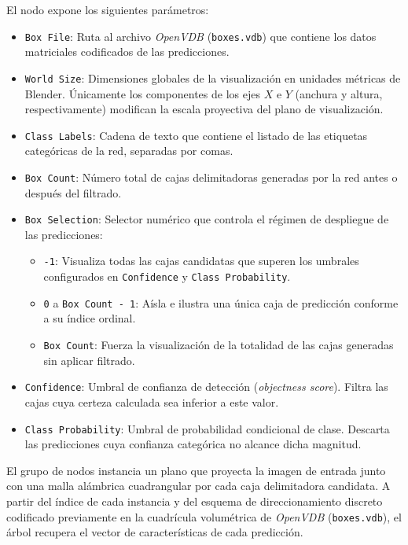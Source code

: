 El nodo expone los siguientes parámetros:
\begin{itemize}
    \item \texttt{Box File}: Ruta al archivo \textit{OpenVDB} (\texttt{boxes.vdb}) que contiene los datos matriciales codificados de las predicciones.
    \item \texttt{World Size}: Dimensiones globales de la visualización en unidades métricas de Blender. Únicamente los componentes de los ejes $X$ e $Y$ 
    (anchura y altura, respectivamente) modifican la escala proyectiva del plano de visualización.
    \item \texttt{Class Labels}: Cadena de texto que contiene el listado de las etiquetas categóricas de la red, separadas por comas.
    \item \texttt{Box Count}: Número total de cajas delimitadoras generadas por la red antes o después del filtrado.
    \item \texttt{Box Selection}: Selector numérico que controla el régimen de despliegue de las predicciones:
    \begin{itemize}
        \item \texttt{-1}: Visualiza todas las cajas candidatas que superen los umbrales configurados en \texttt{Confidence} y \texttt{Class Probability}.
        \item \texttt{0} a \texttt{Box Count - 1}: Aísla e ilustra una única caja de predicción conforme a su índice ordinal.
        \item \texttt{Box Count}: Fuerza la visualización de la totalidad de las cajas generadas sin aplicar filtrado.
    \end{itemize}
    \item \texttt{Confidence}: Umbral de confianza de detección (\textit{objectness score}). Filtra las cajas cuya certeza calculada sea inferior a este valor.
    \item \texttt{Class Probability}: Umbral de probabilidad condicional de clase. Descarta las predicciones cuya confianza categórica no alcance dicha magnitud.
\end{itemize}
El grupo de nodos instancia un plano que proyecta la imagen de entrada junto con una malla alámbrica cuadrangular por cada caja delimitadora candidata. 
A partir del índice de cada instancia y del esquema de direccionamiento discreto codificado previamente en la cuadrícula volumétrica de 
\textit{OpenVDB} (\texttt{boxes.vdb}), el árbol recupera el vector de características de cada predicción.

